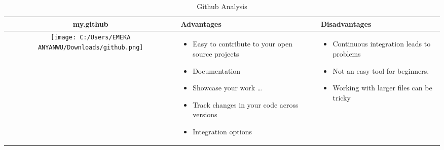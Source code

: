 \documentclass{article}
\begin{document}
	
\begin{table}[h!]
	\centering
	\begin{tabular}{ | c | m{5cm} |m{5cm} | }
		\hline
		my.github & Advantages & Disadvantages \\ \hline
		\begin{minipage}{.4\textwidth}
			\texttt{[image: C:/Users/EMEKA ANYANWU/Downloads/github.png]}
		\end{minipage}
		&		
		 \begin{itemize}
		  	\item Easy to contribute to your open source projects
		  	\item Documentation
		  	\item Showcase your work \ldots
		  	\item Track changes in your code across versions
		  	\item Integration options
		  \end{itemize}
	  	&
		 \begin{itemize}
	  	  	\item Continuous integration leads to problems
	  	  	\item Not an easy tool for beginners.
	  	  	\item Working with larger files can be tricky
	  	  \end{itemize}
		\\ \hline
	\end{tabular}
	\caption{Github Analysis}\label{tbl:mygithub}
\end{table}
	
\end{document}
